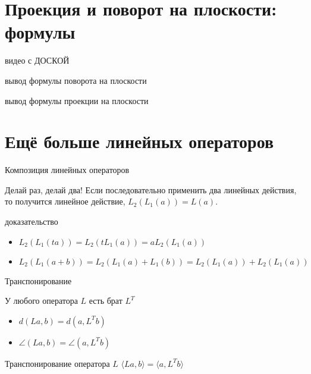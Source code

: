 \documentclass[14pt,xcolor=dvipsnames]{beamer}
\begin{document}
\section{Проекция и поворот на плоскости: формулы}
  
\begin{frame}{видео с ДОСКОЙ}

\begin{block}{вывод формулы поворота на плоскости}
\end{block}

\begin{block}{вывод формулы проекции на плоскости}
\end{block}


\end{frame}
  

\section{Ещё больше линейных операторов}

\begin{frame}{Композиция линейных операторов}

\begin{block}{Делай раз, делай два!}
Если последовательно применить два линейных действия, то получится линейное действие, $L_2 (L_1 (a)) = L(a)$.
\end{block}

\begin{block}{доказательство}
  \begin{itemize}
    \item $L_2 (L_1 (t a)) = L_2 (t L_1 (a)) = a L_2(L_1(a))$
    \item $L_2 (L_1 (a + b)) = L_2 (L_1 (a) + L_1(b)) = L_2(L_1(a)) + L_2(L_1(a))$
  \end{itemize}
\end{block}

\end{frame}


\begin{frame}{Транспонирование}

\begin{block}{У любого оператора $L$ есть брат $L^T$}
\begin{itemize}
  \item $d(La, b)=d(a, L^Tb)$
  \item $\angle(La, b) = \angle(a, L^Tb)$
\end{itemize}
\end{block}

\begin{block}{Транспонирование оператора $L$}
  $\langle La, b\rangle = \langle a, L^T b\rangle$
\end{block}

\end{frame}
\end{document}
